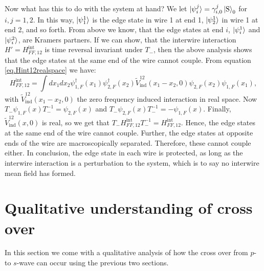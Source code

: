 Now what has this to do with the system at hand? We let $\ket{\psi_{i}^{j}} = \gamma_{i,0}^{j}\ket{\text{S}}_0$ for $i, j = 1, 2$. In this way, $\ket{\psi_{1}^1}$ is the edge state in wire 1 at end 1, $\ket{\psi_{2}^1}$ in wire 1 at end 2, and so forth. From above we know, that the edge states at end $i$, $\ket{\psi_{i}^1}$ and $\ket{\psi_{i}^2}$, are Kramers partners. If we can show, that the interwire interaction $H' = H^\text{int}_{FF,12}$ is time reversal invariant under $T_-$, then the above analysis shows that the edge states at the same end of the wire cannot couple. From equation \eqref{eq.Hint12realspace} we have:
\begin{equation}
H^\text{int}_{FF,12} = \int dx_1 dx_2 \psi^\dagger_{1,F}(x_1)\psi^\dagger_{2,F}(x_2) \tilde{V}_{\text{ind}}^{12}(x_1-x_2,0) \psi_{2,F}(x_2)\psi_{1,F}(x_1),
\end{equation}
with $\tilde{V}_{\text{ind}}^{12}(x_1-x_2,0)$ the zero frequency induced interaction in real space. Now $T_-\psi_{1,F}(x)T^{-1}_- = \psi_{2,F}(x)$ and $T_-\psi_{2,F}(x)T^{-1}_- = -\psi_{1,F}(x)$. Finally, $\tilde{V}_{\text{ind}}^{12}(x, 0)$ is real, so we get that $T_-H^\text{int}_{FF,12}T_-^{-1} = H^\text{int}_{FF,12}$. Hence, the edge states at the same end of the wire cannot couple. Further, the edge states at opposite ends of the wire are macroscopically separated. Therefore, these cannot couple either. In conclusion, the edge state in each wire is protected, as long as the interwire interaction is a perturbation to the system, which is to say no interwire mean field has formed.  

\section{Qualitative understanding of cross over}
\label{sec.2wirestransitionqualitative}
In this section we come with a qualitative analysis of how the cross over from $p$- to $s$-wave can occur using the previous two sections. 

